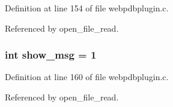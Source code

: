 Definition at line 154 of file webpdbplugin.c.

Referenced by open\_\-file\_\-read.
\subsubsection{\setlength{\rightskip}{0pt plus 5cm}int show\_\-msg = 1\hspace{0.3cm}{\tt  [static]}}\label{webpdbplugin_8c_a1}




Definition at line 160 of file webpdbplugin.c.

Referenced by open\_\-file\_\-read.